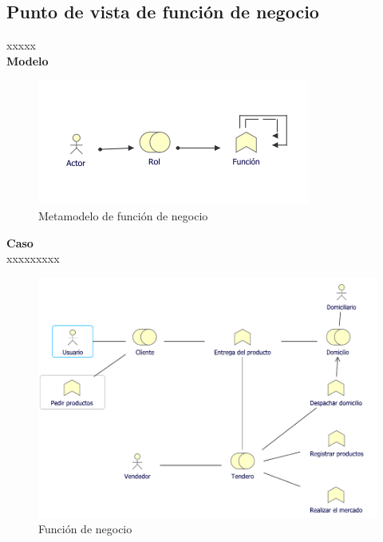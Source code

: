 	\subsection{Punto de vista de función de negocio}
	{ xxxxx\\
		
		\textbf{Modelo}\\
		\begin{figure}[H]
			\centering
			\includegraphics[width=0.8\linewidth]{development/funcion.png}
			\caption{Metamodelo de función de negocio}
		\end{figure}
		
		\textbf{Caso}\\
		xxxxxxxxx\\
		
		\begin{figure}[H]
			\centering
			\includegraphics[width=0.8\linewidth]{development/funcion.pdf}
			\caption{Función de negocio}
		\end{figure}
	}
	
